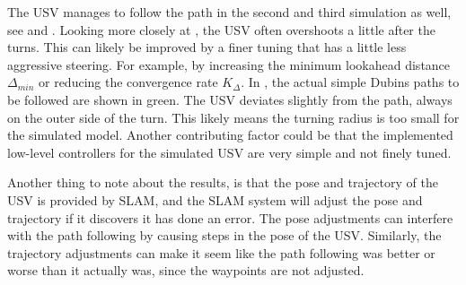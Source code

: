 The USV manages to follow the path in the second and third simulation as well, see  and . Looking more closely at , the USV often overshoots a little after the turns. This can likely be improved by a finer tuning that has a little less aggressive steering. For example, by increasing the minimum lookahead distance $\Delta_{min}$ or reducing the convergence rate $K_\Delta$. In , the actual simple Dubins paths to be followed are shown in green. The USV deviates slightly from the path, always on the outer side of the turn. This likely means the turning radius is too small for the simulated model. Another contributing factor could be that the implemented low-level controllers for the simulated USV are very simple and not finely tuned.

Another thing to note about the results, is that the pose and trajectory of the USV is provided by SLAM, and the SLAM system will adjust the pose and trajectory if it discovers it has done an error. The pose adjustments can interfere with the path following by causing steps in the pose of the USV. Similarly, the trajectory adjustments can make it seem like the path following was better or worse than it actually was, since the waypoints are not adjusted.
